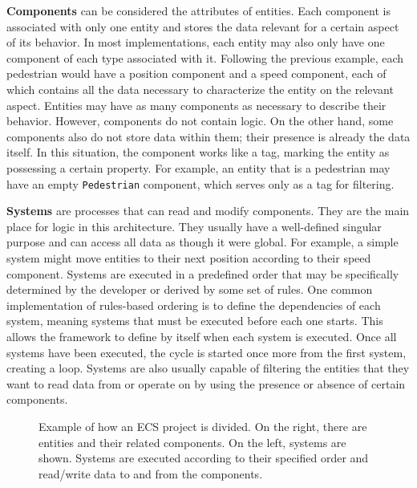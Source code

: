 \documentclass[twoside, 11pt]{article}
\begin{document}
\textbf{Components} can be considered the attributes of entities. Each component is associated with only one entity and stores the data relevant for a certain aspect of its behavior. In most implementations, each entity may also only have one component of each type associated with it. Following the previous example, each pedestrian would have a position component and a speed component, each of which contains all the data necessary to characterize the entity on the relevant aspect. Entities may have as many components as necessary to describe their behavior. However, components do not contain logic. On the other hand, some components also do not store data within them; their presence is already the data itself. In this situation, the component works like a tag, marking the entity as possessing a certain property. For example, an entity that is a pedestrian may have an empty \verb|Pedestrian| component, which serves only as a tag for filtering.

\textbf{Systems} are processes that can read and modify components. They are the main place for logic in this architecture. They usually have a well-defined singular purpose and can access all data as though it were global. For example, a simple system might move entities to their next position according to their speed component. Systems are executed in a predefined order that may be specifically determined by the developer or derived by some set of rules. One common implementation of rules-based ordering is to define the dependencies of each system, meaning systems that must be executed before each one starts. This allows the framework to define by itself when each system is executed. Once all systems have been executed, the cycle is started once more from the first system, creating a loop. Systems are also usually capable of filtering the entities that they want to read data from or operate on by using the presence or absence of certain components.

\begin{figure}[h]
  \centering
  
  \caption[Example of how an ECS project is divided]{Example of how an ECS project is divided. On the right, there are entities and their related components. On the left, systems are shown. Systems are executed according to their specified order and read/write data to and from the components.}
  \label{fig:ecs_basic_example}
\end{figure}
\end{document}
